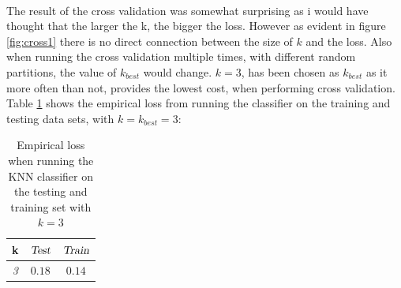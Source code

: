 \documentclass{article}
\begin{document}
\\ The result of the cross validation was somewhat surprising as i would have thought that the larger the k, the bigger the loss. However as evident in figure \ref{fig:cross1} there is no direct connection between the size of $k$ and the loss. Also when running the cross validation multiple times, with different random partitions, the value of $k_{best}$ would change. $k=3$, has been chosen as $k_{best}$ as it more often than not, provides the lowest cost, when performing cross validation. Table \ref{tab:table2} shows the empirical loss from running the classifier on the training and testing data sets, with $k = k_{best} = 3$:
\begin{table}[H]
  \centering
  \label{tab:table2}
  \begin{tabular}{c||c|c}
    \textsf{k} & $\textsl{Test}$ & $\textsl{Train}$\\
    \hline
    \textsl{3} & $0.18$ & $0.14$ \\
  \end{tabular}
  \caption{Empirical loss when running the KNN classifier on the testing and training set with $k=3$} 
\end{table}
\end{document}
